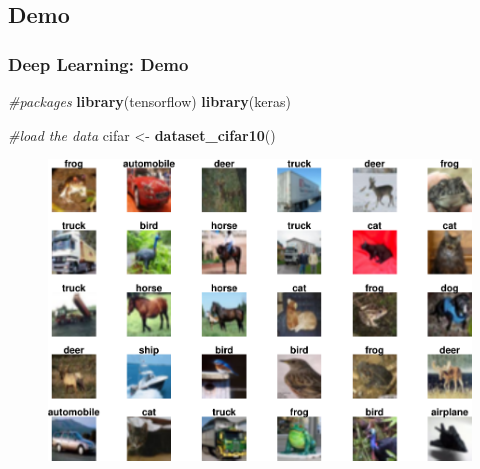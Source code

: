 \documentclass[
  shownotes,
  xcolor={svgnames},
  hyperref={colorlinks,citecolor=DarkBlue,linkcolor=DarkRed,urlcolor=DarkBlue}
  , aspectratio=169]{beamer}
\newenvironment{Shaded}{\begin{snugshade}}{\end{snugshade}}
\newcommand{\CommentTok}[1]{\textcolor[rgb]{0.56,0.35,0.01}{\textit{#1}}}
\newcommand{\KeywordTok}[1]{\textcolor[rgb]{0.13,0.29,0.53}{\textbf{#1}}}
\newcommand{\NormalTok}[1]{#1}
\newcommand{\StringTok}[1]{\textcolor[rgb]{0.31,0.60,0.02}{#1}}
\begin{document}
\subsection{Demo}
\begin{frame}[fragile]
\frametitle{Deep Learning: Demo}

\begin{scriptsize}

\begin{Shaded}
\begin{Highlighting}[]
\CommentTok{\#packages}
\KeywordTok{library}\NormalTok{(tensorflow)}
\KeywordTok{library}\NormalTok{(keras)}

\CommentTok{\#load the data}
\NormalTok{cifar \textless{}{-}}\StringTok{ }\KeywordTok{dataset\_cifar10}\NormalTok{()}
\end{Highlighting}
\end{Shaded}
\end{scriptsize}




  \begin{figure}[H] \centering
            \captionsetup{justification=centering}
              \includegraphics[scale=0.5]{figures/unnamed-chunk-2-1.pdf}
              \\
              \tiny
             
 \end{figure}


\end{frame}
\end{document}
